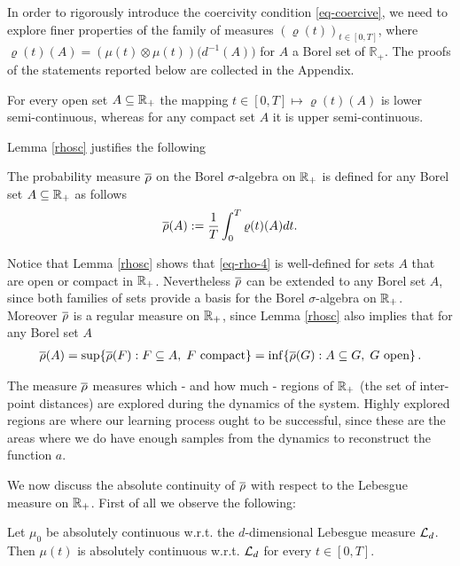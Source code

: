 In order to rigorously introduce the coercivity condition \eqref{eq-coercive}, we need to explore finer properties of the family of measures $(\varrho(t))_{t \in [0,T]}$, where 
$\varrho(t)(A)=(\mu(t)\otimes\mu(t))\bigl(d^{-1}(A)\bigr)$ for $A$ a Borel set of $\mathbb{R}_+$.
The proofs of the statements reported below are collected in the Appendix.

\begin{lemma}\label{rhosc}
	For every open set $A\subseteq\mathbb{R}_+$ the mapping $t \in [0,T] \mapsto\varrho(t)(A)$ is lower semi-continuous, whereas for
	any compact set $A$ it is upper semi-continuous.
\end{lemma}


Lemma \ref{rhosc} justifies the following
\begin{definition}
The probability measure $\overline\rho$ on the Borel $\sigma$-algebra on $\mathbb{R}_+$ is defined for any Borel set $A \subseteq \mathbb{R}_+$ as follows
\begin{align}\label{eq-rho-4}
	\overline\rho(A):=\frac{1}{T}\int_0^T\varrho(t)(A)dt.
\end{align}
\end{definition}
{Notice that Lemma \ref{rhosc} shows that \eqref{eq-rho-4} is well-defined  for sets $A$ that are open or compact in $\mathbb{R}_+$. Nevertheless $\overline\rho$ can be extended to any Borel set $A$, since both families of sets provide a basis for the Borel $\sigma$-algebra on $\mathbb{R}_+$.} Moreover $\overline\rho$ is a regular measure on $\mathbb{R}_+$, since Lemma \ref{rhosc} also implies that for any Borel set $A$
\begin{align*}
	\overline\rho(A) =  \sup\{\overline\rho(F) : F \subseteq A, \;F \text{ compact}\} = \inf\{\overline\rho(G) : A \subseteq G, \;G \text{ open}\}\,.
\end{align*}

\vspace{0.3cm}

The measure $\overline\rho$ measures which - and how much - regions of $\mathbb{R}_+$ (the set of inter-point distances) are explored during the dynamics of the system. Highly explored regions are where our learning process ought to be successful, since these are the areas where we do have enough samples from the dynamics to reconstruct the function $a$.

We now discuss the absolute continuity of $ \overline\rho$ with respect to the Lebesgue measure on $\mathbb{R}_+$. First of all we observe the following:

\begin{lemma}\label{lemma-AC-1}
	Let $\mu_0$ be absolutely continuous w.r.t. the $d$-dimensional Lebesgue measure $\mathcal{L}_d$. Then $\mu(t)$ is absolutely continuous w.r.t. $\mathcal{L}_d$ for every $t\in [0,T]$.
\end{lemma}

